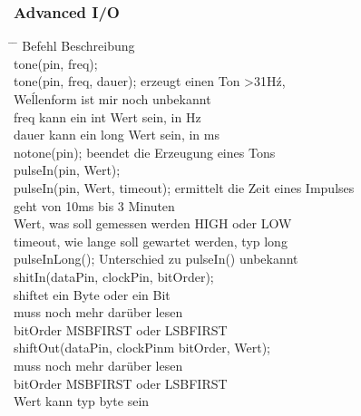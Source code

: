 \documentclass[10pt,a4paper,oneside]{article}
\begin{document}
\subsubsection{Advanced I/O}
\begin{tabbing}
  \hspace*{1mm} \=\hspace{50mm} \= \kill
  \>Befehl \>Beschreibung \\
  \>tone(pin, freq); \>  \\
  \>tone(pin, freq, dauer); \> erzeugt einen Ton >31Hź,\\ 
  \> \> Weĺlenform ist mir noch unbekannt\\
  \> \> freq kann ein int Wert sein, in Hz\\ 
  \> \> dauer kann ein long Wert sein, in ms\\
  \>notone(pin); \> beendet die Erzeugung eines Tons \\ 
  \>pulseIn(pin, Wert); \> \\ 
  \>pulseIn(pin, Wert, timeout); \> ermittelt die Zeit eines Impulses\\ 
  \> \>  geht von 10ms bis 3 Minuten\\
  \> \> Wert, was soll gemessen werden HIGH oder LOW\\ 
  \> \> timeout, wie lange soll gewartet werden, typ long\\ 
  \>pulseInLong(); \>  Unterschied zu pulseIn() unbekannt\\
  \>shitIn(dataPin, clockPin, bitOrder); \> \\ 
  \> \> shiftet ein Byte oder ein Bit\\ 
  \> \> muss noch mehr darüber lesen\\ 
  \> \> bitOrder MSBFIRST oder LSBFIRST\\ 
  \>shiftOut(dataPin, clockPinm bitOrder, Wert); \> \\ 
  \> \> muss noch mehr darüber lesen \\ 
  \> \> bitOrder MSBFIRST oder LSBFIRST\\ 
  \> \> Wert kann typ byte sein\\
\end{tabbing}
\end{document}
